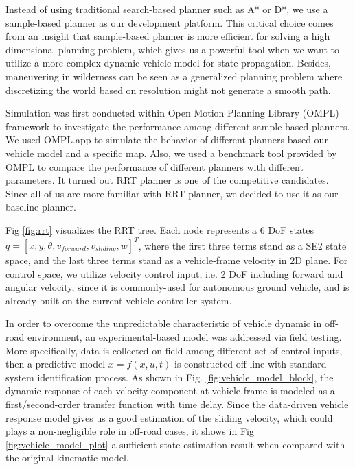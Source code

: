 \documentclass[../thesis.tex]{subfiles}
\begin{document}
Instead of using traditional search-based planner such as A* or D*, we use a sample-based planner as our development platform. This critical choice comes from an insight that sample-based planner is more efficient for solving a high dimensional planning problem, which gives us a powerful tool when we want to utilize a more complex dynamic vehicle model for state propagation. Besides, maneuvering in wilderness can be seen as a generalized planning problem where discretizing the world based on resolution might not generate a smooth path.

Simulation was first conducted within Open Motion Planning Library (OMPL) framework to investigate the performance among different sample-based planners. We used OMPL.app to simulate the behavior of different planners based our vehicle model and a specific map. Also, we used a benchmark tool provided by OMPL to compare the performance of different planners with different parameters. It turned out RRT planner is one of the competitive candidates. Since all of us are more familiar with RRT planner, we decided to use it as our baseline planner. 

Fig \ref{fig:rrt} visualizes the RRT tree. Each node represents a $6$ DoF states $q=[x,y, \theta ,v_{forward}, v_{sliding}, w]^T$, where the first three terms stand as a SE2 state space, and the last three terms stand as a vehicle-frame velocity in 2D plane. For control space, we utilize velocity control input, i.e. 2 DoF including forward and angular velocity, since it is commonly-used for autonomous ground vehicle, and is already built on the current vehicle controller system. 

In order to overcome the unpredictable characteristic of vehicle dynamic in off-road environment, an experimental-based model was addressed via field testing. More specifically, data is collected on field among different set of control inputs, then a predictive model $\dot{x}=f(x,u,t)$ is constructed off-line with standard system identification process. As shown in Fig. \ref{fig:vehicle_model_block}, the dynamic response of each velocity component at vehicle-frame is modeled as a first/second-order transfer function with time delay. Since the data-driven vehicle response model gives us a good estimation of the sliding velocity, which could plays a non-negligible role in off-road cases, it shows in Fig \ref{fig:vehicle_model_plot} a sufficient state estimation result when compared with the original kinematic model.
\end{document}
